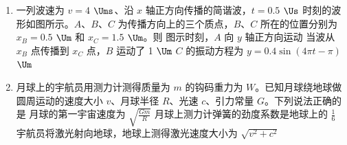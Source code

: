 \documentclass[\gkver]{gaokaozhenti}
\begin{document}
\begin{enumerate}
{A．根据 $\frac{n_{1}}{n_{2}}=\frac{U_{1}}{U_{2}}=\frac{220}{4}=\frac{55}{1}$，原、副线圈匝数比为 $55:1$，故 A 错误；

B．根据 $\frac{I_{1}}{I_{2}}=\frac{n_{2}}{n_{1}}=\frac{1}{55}$，原、副线圈电流比为 $1:55$，故 B 错误；

C．输入功率等于输出功率，$P_{1}=P_{2}=U_{2}I_{2}=4\mathrm{V}\times12.1\mathrm{A}=48.4\mathrm{W}$，故 C 错误；

D．原线圈电流 $I_{1}=\frac{P_{1}}{U_{1}}=\frac{48.4\mathrm{W}}{220\mathrm{V}}=0.22\mathrm{A}$，故 D 正确。

故选 D。
}

\item
一列波速为 $v=4$ $\Ums$、沿 $x$ 轴正方向传播的简谐波，$t=0.5$ $\Us$ 时刻的波形如图所示。$A$、$B$、$C$ 为传播方向上的三个质点，$B$、$C$ 所在的位置分别为 $x_{B}=0.5$ $\Um$ 和 $x_{C}=1.5$ $\Um$。则
{图示时刻，$A$ 向 $y$ 轴正方向运动}
{当波从 $x_{B}$ 点传播到 $x_{C}$ 点，$B$ 运动了 1 $\Um$}
{$C$ 的振动方程为 $y=0.4\sin(4\pi t-\pi)$ $\Um$}

\item
月球上的宇航员用测力计测得质量为 $m$ 的钩码重力为 $W$。已知月球绕地球做圆周运动的速度大小 $v$、月球半径 $R$、光速 $c$、引力常量 $G$。下列说法正确的是
\onepicture[w=6.2cm]{}
{月球的第一宇宙速度为 $\sqrt{\frac{Gm}{R}}$}
{月球上测力计弹簧的劲度系数是地球上的 $\frac{1}{6}$}
{宇航员将激光射向地球，地球上测得激光速度大小为 $\sqrt{v^{2}+c^{2}}$}
\end{enumerate}
\end{document}
